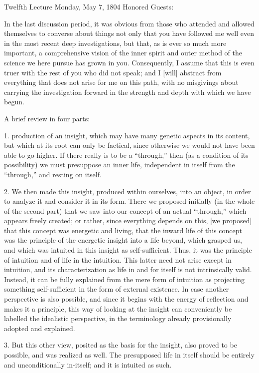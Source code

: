 Twelfth Lecture
Monday, May 7, 1804
Honored Guests:

In the last discussion period,
it was obvious from those who attended
and allowed themselves to converse about things
not only that you have followed me well
even in the most recent deep investigations,
but that, as is ever so much more important,
a comprehensive vision of the inner spirit
and outer method of the science
we here pursue has grown in you.
Consequently, I assume that this is
even truer with the rest of you who did not speak;
and I [will] abstract from everything
that does not arise for me on this path,
with no misgivings about carrying the investigation
forward in the strength and depth with which we have begun.

A brief review in four parts:

1. production of an insight,
which may have many genetic aspects in its content,
but which at its root can only be factical,
since otherwise we would not have been able to go higher.
If there really is to be a “through,”
then (as a condition of its possibility)
we must presuppose an inner life,
independent in itself from the “through,”
and resting on itself.

2. We then made this insight,
produced within ourselves,
into an object, in order to analyze it
and consider it in its form.
There we proposed initially (in the whole of the second part)
that we saw into our concept of an actual “through,”
which appears freely created;
or rather, since everything depends on this,
[we proposed] that this concept was energetic and living,
that the inward life of this concept was
the principle of the energetic insight into a life beyond,
which grasped us, and which was intuited
in this insight as self-sufficient.
Thus, it was the principle of intuition
and of life in the intuition.
This latter need not arise except in intuition,
and its characterization as life in and for itself
is not intrinsically valid.
Instead, it can be fully explained
from the mere form of intuition
as projecting something self-sufficient
in the form of external existence.
In case another perspective is also possible,
and since it begins with the energy of reflection
and makes it a principle,
this way of looking at the insight can conveniently
be labelled the idealistic perspective,
in the terminology already provisionally adopted and explained.

3. But this other view, posited as the basis for the insight,
also proved to be possible, and was realized as well.
The presupposed life in itself should be
entirely and unconditionally in-itself;
and it is intuited as such.


